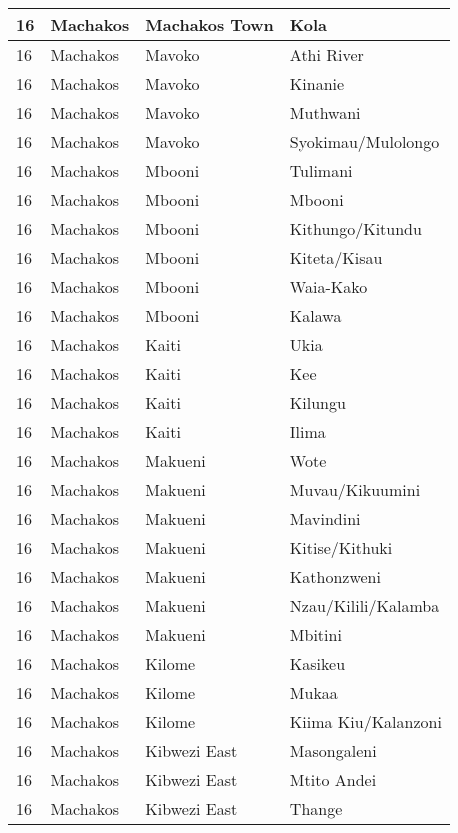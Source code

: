 \begin{table}[!ht]
\begin{tabular}{|l|l|l|l|}
        16 & Machakos & Machakos Town & Kola \\ \hline
        16 & Machakos & Mavoko & Athi River \\ \hline
        16 & Machakos & Mavoko & Kinanie \\ \hline
        16 & Machakos & Mavoko & Muthwani \\ \hline
        16 & Machakos & Mavoko & Syokimau/Mulolongo \\ \hline
        16 & Machakos & Mbooni & Tulimani \\ \hline
        16 & Machakos & Mbooni & Mbooni \\ \hline
        16 & Machakos & Mbooni & Kithungo/Kitundu \\ \hline
        16 & Machakos & Mbooni & Kiteta/Kisau \\ \hline
        16 & Machakos & Mbooni & Waia-Kako \\ \hline
        16 & Machakos & Mbooni & Kalawa \\ \hline
        16 & Machakos & Kaiti & Ukia \\ \hline
        16 & Machakos & Kaiti & Kee \\ \hline
        16 & Machakos & Kaiti & Kilungu \\ \hline
        16 & Machakos & Kaiti & Ilima \\ \hline
        16 & Machakos & Makueni & Wote \\ \hline
        16 & Machakos & Makueni & Muvau/Kikuumini \\ \hline
        16 & Machakos & Makueni & Mavindini \\ \hline
        16 & Machakos & Makueni & Kitise/Kithuki \\ \hline
        16 & Machakos & Makueni & Kathonzweni \\ \hline
        16 & Machakos & Makueni & Nzau/Kilili/Kalamba \\ \hline
        16 & Machakos & Makueni & Mbitini \\ \hline
        16 & Machakos & Kilome & Kasikeu \\ \hline
        16 & Machakos & Kilome & Mukaa \\ \hline
        16 & Machakos & Kilome & Kiima Kiu/Kalanzoni \\ \hline
        16 & Machakos & Kibwezi East & Masongaleni \\ \hline
        16 & Machakos & Kibwezi East & Mtito Andei \\ \hline
        16 & Machakos & Kibwezi East & Thange \\ \hline

\end{tabular}
\end{table}
